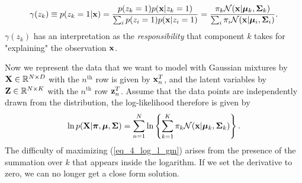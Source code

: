 \documentclass[../main.tex]{subfiles}
\begin{document}
\begin{align*}
\gamma(z_k) \equiv p(z_k=1|{\bf x})= \frac{p(z_k=1)p({\bf x}|z_k=1)}{\sum_i p(z_i=1)p({\bf x}|z_i=1)}= \frac{\pi_k \mathcal{N}({\bf x}|\bm{\mu}_k, {\bf\Sigma}_k)}{\sum_{i} \pi_i \mathcal{N}({\bf x}|\bm{\mu}_i, {\bf\Sigma}_i)}.
\end{align*}
$\gamma(z_k)$ has an interpretation as the \emph{responsibility} that component $k$ takes for "explaining" the observation ${\bf x}$. 
\par Now we represent the data that we want to model with Gaussian mixtures by ${\bf X}\in \mathbb{R}^{N\times D}$ with the $n^{\text{th}}$ row is given by ${\bf x}_n^T$, and the latent variables by ${\bf Z}\in \mathbb{R}^{N\times K}$ with the $n^{\text{th}}$ row ${\bf z}_n^T$. Assume that the data points are independently drawn from the distribution, the log-likelihood therefore is given by
\begin{equation}\label{eq_4_log_l_gm}
\ln p({\bf X}|\bm{\pi},\bm{\mu},{\bf \Sigma}) = \sum_{n=1}^{N}\ln \left\{\sum_{k=1}^{K} \pi_k \mathcal{N}({\bf x}|\bm{\mu}_k, {\bf\Sigma}_k)\right\}.
\end{equation}
The difficulty of maximizing (\ref{eq_4_log_l_gm}) arises from the presence of the summation over $k$ that appears inside the logarithm. If we set the derivative to zero, we can no longer get a close form solution.
\end{document}
